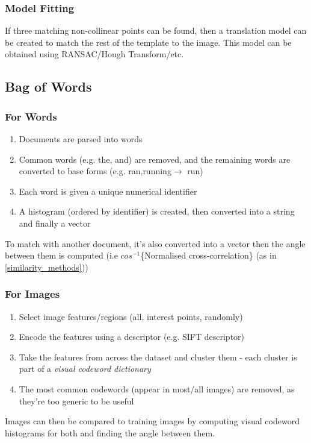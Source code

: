 \subsubsection{Model Fitting}
If three matching non-collinear points can be found, then a translation model can be created to match the rest of the template to the image. This model can be obtained using RANSAC/Hough Transform/etc. 

\subsection{Bag of Words}

\subsubsection{For Words}
\begin{enumerate}
    \item Documents are parsed into words
    \item Common words (e.g. the, and) are removed, and the remaining words are converted to base forms (e.g. ran,running$\rightarrow$ run)
    \item Each word is given a unique numerical identifier
    \item A histogram (ordered by identifier) is created, then converted into a string and finally a vector
\end{enumerate}
To match with another document, it's also converted into a vector then the angle between them is computed (i.e $cos^{-1}$\{Normalised cross-correlation\} (as in \ref{similarity_methods}))

\subsubsection{For Images}
\begin{enumerate}
    \item Select image features/regions (all, interest points, randomly)
    \item Encode the features using a descriptor (e.g. SIFT descriptor)
    \item Take the features from across the dataset and cluster them - each cluster is part of a \emph{visual codeword dictionary}
    \item The most common codewords (appear in most/all images) are removed, as they're too generic to be useful
\end{enumerate}
Images can then be compared to training images by computing visual codeword histograms for both and finding the angle between them.

